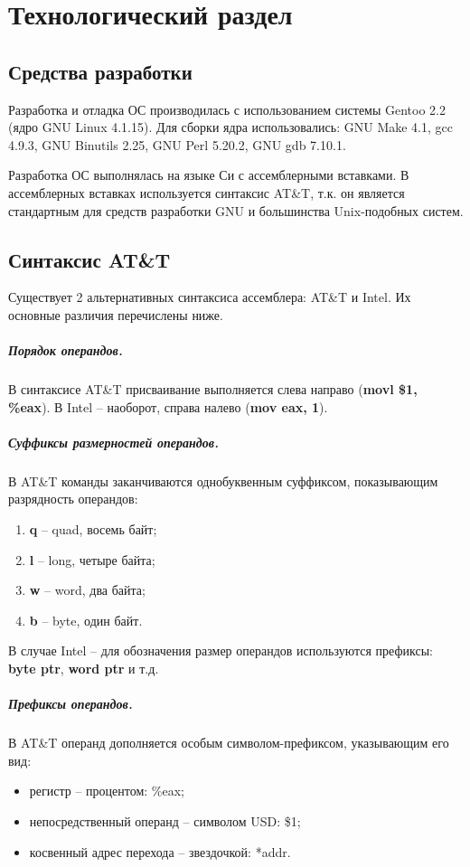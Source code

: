 \chapter{Технологический раздел}
\label{cha:impl}

\section{Средства разработки}
Разработка и отладка ОС производилась с использованием системы Gentoo 2.2 (ядро
GNU Linux 4.1.15). Для сборки ядра использовались: GNU Make 4.1, gcc 4.9.3, GNU
Binutils 2.25, GNU Perl 5.20.2, GNU gdb 7.10.1.

Разработка ОС выполнялась на языке Си с ассемблерными вставками. В ассемблерных
вставках используется синтаксис AT\&T, т.к. он является стандартным для средств
разработки GNU и большинства Unix-подобных систем.

\section{Синтаксис AT\&T}
Существует 2 альтернативных синтаксиса ассемблера: AT\&T и Intel. Их основные
различия перечислены ниже.

\paragraph{Порядок операндов.} В синтаксисе AT\&T присваивание выполняется слева
направо (\textbf{movl \$1, \%eax}). В Intel -- наоборот, справа налево (\textbf{mov eax, 1}).

\paragraph{Суффиксы размерностей операндов.} В AT\&T команды заканчиваются однобуквенным
суффиксом, показывающим разрядность операндов:
\begin{enumerate}[1.]
	\item \textbf{q} -- quad, восемь байт;
	\item \textbf{l} -- long, четыре байта;
	\item \textbf{w} -- word, два байта;
	\item \textbf{b} -- byte, один байт.
\end{enumerate}

В случае Intel -- для обозначения размер операндов используются префиксы: \textbf{byte ptr},
\textbf{word ptr} и т.д.

\paragraph{Префиксы операндов.} В AT\&T операнд дополняется особым символом-префиксом,
указывающим его вид:
\begin{itemize}
\item регистр -- процентом: \%eax;
\item непосредственный операнд -- символом USD: \$1;
\item косвенный адрес перехода -- звездочкой: *addr.
\end{itemize}

